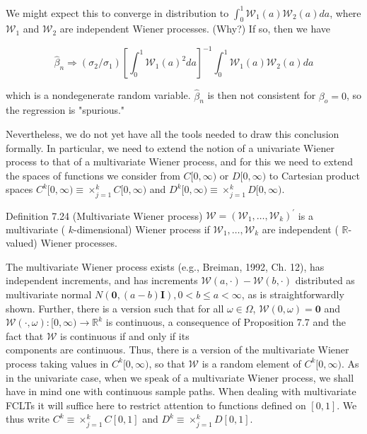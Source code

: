 \documentclass[10pt]{article}
\begin{document}
We might expect this to converge in distribution to $\int_{0}^{1} \mathcal{W}_{1}(a) \mathcal{W}_{2}(a) d a$, where $\mathcal{W}_{1}$ and $\mathcal{W}_{2}$ are independent Wiener processes. (Why?) If so, then we have

$$
\hat{\beta}_{n} \Rightarrow\left(\sigma_{2} / \sigma_{1}\right)\left[\int_{0}^{1} \mathcal{W}_{1}(a)^{2} d a\right]^{-1} \int_{0}^{1} \mathcal{W}_{1}(a) \mathcal{W}_{2}(a) d a
$$

which is a nondegenerate random variable. $\hat{\beta}_{n}$ is then not consistent for $\beta_{o}=0$, so the regression is "spurious."

Nevertheless, we do not yet have all the tools needed to draw this conclusion formally. In particular, we need to extend the notion of a univariate Wiener process to that of a multivariate Wiener process, and for this we need to extend the spaces of functions we consider from $C[0, \infty)$ or $D[0, \infty)$ to Cartesian product spaces $C^{k}[0, \infty) \equiv \times_{j=1}^{k} C[0, \infty)$ and $D^{k}[0, \infty) \equiv \times_{j=1}^{k} D[0, \infty)$.

Definition 7.24 (Multivariate Wiener process) $\mathcal{W}=\left(\mathcal{W}_{1}, \ldots, \mathcal{W}_{k}\right)^{\prime}$ is a multivariate ( $k$-dimensional) Wiener process if $\mathcal{W}_{1}, \ldots, \mathcal{W}_{k}$ are independent ( $\mathbb{R}$-valued) Wiener processes.

The multivariate Wiener process exists (e.g., Breiman, 1992, Ch. 12), has independent increments, and has increments $\mathcal{W}(a, \cdot)-\mathcal{W}(b, \cdot)$ distributed as multivariate normal $N(\mathbf{0},(a-b) \mathbf{I}), 0<b \leq a<\infty$, as is straightforwardly shown. Further, there is a version such that for all $\omega \in \Omega$, $\mathcal{W}(0, \omega)=\mathbf{0}$ and $\mathcal{W}(\cdot, \omega):[0, \infty) \rightarrow \mathbb{R}^{k}$ is continuous, a consequence of Proposition 7.7 and the fact that $\mathcal{W}$ is continuous if and only if its\\
components are continuous. Thus, there is a version of the multivariate Wiener process taking values in $C^{k}[0, \infty)$, so that $\mathcal{W}$ is a random element of $C^{k}[0, \infty)$. As in the univariate case, when we speak of a multivariate Wiener process, we shall have in mind one with continuous sample paths. When dealing with multivariate FCLTs it will suffice here to restrict attention to functions defined on $[0,1]$. We thus write $C^{k} \equiv \times_{j=1}^{k} C[0,1]$ and $D^{k} \equiv \times_{j=1}^{k} D[0,1]$.
\end{document}
